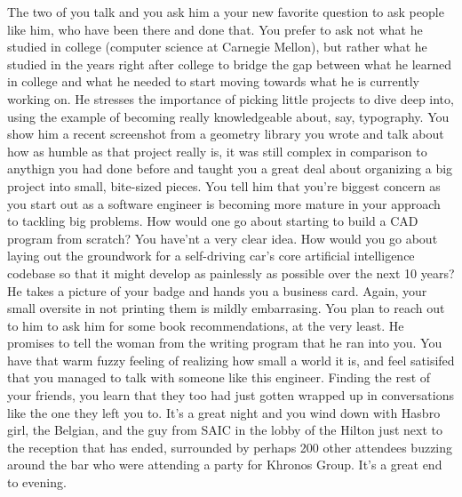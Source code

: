 \documentclass[../main.tex]{subfiles}
\begin{document}
The two of you talk and you ask him a your new favorite question to ask people like him, who have been there and done that. You prefer to ask not what he studied in college (computer science at Carnegie Mellon), but rather what he studied in the years right after college to bridge the gap between what he learned in college and what he needed to start moving towards what he is currently working on. He stresses the importance of picking little projects to dive deep into, using the example of becoming really knowledgeable about, say, typography. You show him a recent screenshot from a geometry library you wrote and talk about how as humble as that project really is, it was still complex in comparison to anythign you had done before and taught you a great deal about organizing a big project into small, bite-sized pieces. You tell him that you're biggest concern as you start out as a software engineer is becoming more mature in your approach to tackling big problems. How would one go about starting to build a CAD program from scratch? You have'nt a very clear idea. How would you go about laying out the groundwork for a self-driving car's core artificial intelligence codebase so that it might develop as painlessly as possible over the next 10 years? He takes a picture of your badge and hands you a business card. Again, your small oversite in not printing them is mildly embarrasing. You plan to reach out to him to ask him for some book recommendations, at the very least. He promises to tell the woman from the writing program that he ran into you. You have that warm fuzzy feeling of realizing how small a world it is, and feel satisifed that you managed to talk with someone like this engineer. Finding the rest of your friends, you learn that they too had just gotten wrapped up in conversations like the one they left you to. It's a great night and you wind down with Hasbro girl, the Belgian, and the guy from SAIC in the lobby of the Hilton just next to the reception that has ended, surrounded by perhaps 200 other attendees buzzing around the bar who were attending a party for Khronos Group. It's a great end to evening.
\end{document}
